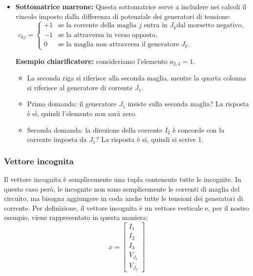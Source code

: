 \begin{itemize}
          Questo procedimento può essere applicato sistematicamente a tutti gli elementi della sottomatrice blu.

    \item \textbf{Sottomatrice marrone:} Questa sottomatrice serve a includere nei calcoli il vincolo imposto dalla differenza di potenziale dei generatori di tensione:
          \[
              c_{kj} =
              \begin{cases}
                  +1 & \text{se la corrente della maglia } j \text{ entra in } J_k \text{dal morsetto negativo}, \\
                  -1 & \text{se la attraversa in verso opposto},                                                 \\
                  0  & \text{se la maglia non attraversa il generatore } J_k.
              \end{cases}
          \]

          \textbf{Esempio chiarificatore:} consideriamo l'elemento \(a_{2,4} = 1\).
          \begin{itemize}
              \item La seconda riga si riferisce alla seconda maglia, mentre la quarta colonna si riferisce al generatore di corrente  \(J_1\).
              \item Prima domanda: il generatore \(J_1\) insiste sulla seconda maglia? La risposta è sì, quindi l’elemento non sarà zero.
              \item Seconda domanda: la direzione della corrente \(I_2\) è concorde con la corrente imposta da \(J_1\)? La risposta è si, quindi si scrive \(1\).
          \end{itemize}
\end{itemize}



\subsubsection*{Vettore incognita}

Il vettore incognita è semplicemente una tupla contenente tutte le incognite. In questo caso però, le incognite non sono semplicemente le correnti di maglia del circuito, ma bisogna aggiungere in coda anche tutte le tensioni dei generatori di corrente. Per definizione, il vettore incognita è un vettore verticale e, per il nostro esempio, viene rappresentato in questa maniera:
\begin{equation}
    x =
    \begin{bmatrix}
        I_1     \\
        I_2     \\
        I_3     \\
        V_{J_1} \\
        V_{J_2}
    \end{bmatrix}
\end{equation}

